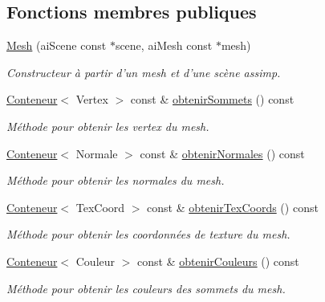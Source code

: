 \subsection*{Fonctions membres publiques}
\begin{DoxyCompactItemize}
\item 
\hyperlink{classmodele_1_1_mesh_a37bac341d514cb2edf8c409d0ee5f7f8}{Mesh} (ai\-Scene const $\ast$scene, ai\-Mesh const $\ast$mesh)
\begin{DoxyCompactList}\small\item\em Constructeur à partir d'un mesh et d'une scène assimp. \end{DoxyCompactList}\item 
\hyperlink{classmodele_1_1_mesh_adbc8897d8cdca4541a2068c874aa54eb}{Conteneur}$<$ Vertex $>$ const \& \hyperlink{classmodele_1_1_mesh_acd81c408cf6963ff4605658cdc45b290}{obtenir\-Sommets} () const 
\begin{DoxyCompactList}\small\item\em Méthode pour obtenir les vertex du mesh. \end{DoxyCompactList}\item 
\hyperlink{classmodele_1_1_mesh_adbc8897d8cdca4541a2068c874aa54eb}{Conteneur}$<$ Normale $>$ const \& \hyperlink{classmodele_1_1_mesh_a88016a49bdd88d70afef9e590c7c4a11}{obtenir\-Normales} () const 
\begin{DoxyCompactList}\small\item\em Méthode pour obtenir les normales du mesh. \end{DoxyCompactList}\item 
\hyperlink{classmodele_1_1_mesh_adbc8897d8cdca4541a2068c874aa54eb}{Conteneur}$<$ Tex\-Coord $>$ const \& \hyperlink{classmodele_1_1_mesh_ac48a1ff182f6b68069b72eff692f8196}{obtenir\-Tex\-Coords} () const 
\begin{DoxyCompactList}\small\item\em Méthode pour obtenir les coordonnées de texture du mesh. \end{DoxyCompactList}\item 
\hyperlink{classmodele_1_1_mesh_adbc8897d8cdca4541a2068c874aa54eb}{Conteneur}$<$ Couleur $>$ const \& \hyperlink{classmodele_1_1_mesh_a4333bdb21580f548ef22bb3954b7c179}{obtenir\-Couleurs} () const 
\begin{DoxyCompactList}\small\item\em Méthode pour obtenir les couleurs des sommets du mesh. \end{DoxyCompactList}\item 

\end{DoxyCompactItemize}
